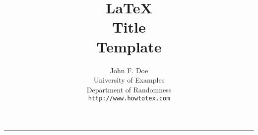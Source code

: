\documentclass[11pt]{article}
\title{	\fontsize{50}{60}\selectfont
			\vspace*{0.7cm}
			\hfill \LaTeX 		\\[0.8cm]
			\hfill Title 	\\[0.8cm]
			\hfill Template%
		}
\author{
		\hfill John F. Doe\\
		\hfill University of Examples\\
		\hfill Department of Randomness\\
        \hfill \texttt{http://www.howtotex.com} \\
}
\makeatletter
\newcommand{\HRule}[1]{\hfill \rule{0.2\linewidth}{#1}} 	%
\def\printtitle{%
    {\centering \@title\par}}
\def\printauthor{%
    {\centering \large \@author}}
\makeatother
\begin{document}
\thispagestyle{empty}				%

\colorbox{grey}{
	\parbox[t]{1.0\linewidth}{
		\printtitle
		\vspace*{0.7cm}
	}
}

  	\vfill
\printauthor								%
\HRule{1pt}
\clearpage

\end{document}
